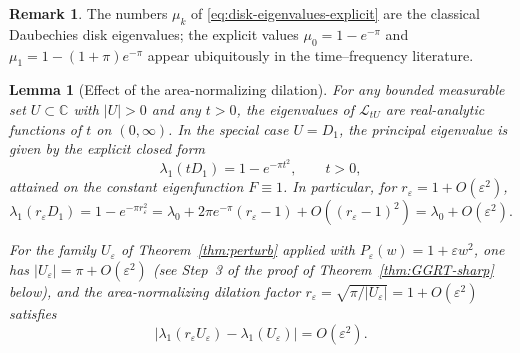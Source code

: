 \documentclass[a4paper,11pt,reqno]{amsart}
\numberwithin{equation}{section}
\theoremstyle{plain} %
\newtheorem{lemma}{Lemma}[section]
\theoremstyle{definition} %
\newtheorem{remark}{Remark}[section]
\theoremstyle{remark}
\newcommand{\C}{\mathbb{C}}
\begin{document}
\begin{remark}\label{rem:disk-eigenvalues-numbers}
The numbers \(\mu_k\) of \eqref{eq:disk-eigenvalues-explicit} are the
classical Daubechies disk eigenvalues; the explicit values
\(\mu_0=1-e^{-\pi}\) and \(\mu_1=1-(1+\pi)e^{-\pi}\) appear ubiquitously in
the time--frequency literature.
\end{remark}

\medskip

\begin{lemma}[Effect of the area-normalizing dilation]
\label{lem:dilation-eigenvalue}
For any bounded measurable set \(U\subset \C\) with \(|U|>0\) and any
\(t>0\), the eigenvalues of \(\mathcal L_{tU}\) are real-analytic functions
of \(t\) on \((0,\infty)\). In the special case \(U=D_1\), the principal
eigenvalue is given by the explicit closed form
\begin{equation}\label{eq:dilated-disk-formula}
\lambda_1(tD_1)=1-e^{-\pi t^2},
\qquad t>0,
\end{equation}
attained on the constant eigenfunction \(F\equiv 1\). In particular, for
\(r_\varepsilon=1+O(\varepsilon^2)\),
\begin{equation}\label{eq:disk-dilation-O-eps2}
\lambda_1(r_\varepsilon D_1)
=
1-e^{-\pi r_\varepsilon^2}
=
\lambda_0+2\pi e^{-\pi}(r_\varepsilon-1)+O((r_\varepsilon-1)^2)
=
\lambda_0+O(\varepsilon^2).
\end{equation}

For the family \(U_\varepsilon\) of Theorem~\ref{thm:perturb} applied with
\(P_\varepsilon(w)=1+\varepsilon w^2\), one has
\(|U_\varepsilon|=\pi+O(\varepsilon^2)\) (see Step~3 of the proof of
Theorem~\ref{thm:GGRT-sharp} below), and the area-normalizing dilation
factor \(r_\varepsilon=\sqrt{\pi/|U_\varepsilon|}=1+O(\varepsilon^2)\)
satisfies
\begin{equation}\label{eq:dilation-eigenvalue-control}
\bigl|\lambda_1(r_\varepsilon U_\varepsilon)-\lambda_1(U_\varepsilon)\bigr|
=
O(\varepsilon^2).
\end{equation}
\end{lemma}
\end{document}
